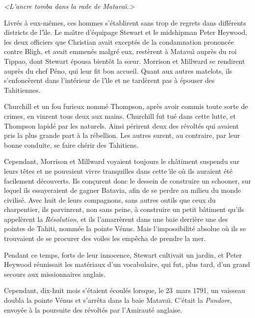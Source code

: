 \pageinsert
\vskip 15cm
\centerline{}
\smallskip
\centerline{\it <L'ancre tomba dans la rade de Matava\"\i.>}
\vfill
\endinsert

Livr\'es \`a eux-m\^emes, ces hommes s'\'etablirent
sans trop de regrets dans diff\'erents districts de
l'{\^\i}le. Le ma{\^\i}tre d'\'equipage Stewart et
le midshipman Peter Heywood, les deux officiers que
Christian avait except\'es de la condamnation
prononc\'ee contre Bligh, et avait emmen\'es
malgr\'e eux, rest\`erent \`a Matava{\"\i}
aupr\`es du roi Tippao, dont Stewart \'epousa
bient\^ot la s{\oe}ur. Morrison et Millward se rendirent
aupr\`es du chef P\'eno, qui leur fit bon accueil.
Quant aux autres matelots, ils s'enfonc\`erent dans
l'int\'erieur de l'{\^\i}le et ne tard\`erent
pas \`a \'epouser des Tahitiennes.

Churchill et un fou furieux nomm\'e Thompson, apr\`es
avoir commis toute sorte de crimes, en vinrent tous
deux aux mains. Churchill fut tu\'e dans cette lutte,
et Thompson lapid\'e par les naturels. Ainsi p\'erirent
deux des r\'evolt\'es qui avaient pris la plus grande
part \`a la r\'ebellion. Les autres surent, au contraire,
par leur bonne conduite, se faire ch\'erir des Tahitiens.

Cependant, Morrison et Millward voyaient toujours
le ch\^atiment suspendu sur leurs t\^etes et
ne pouvaient vivre tranquilles dans cette {\^\i}le
o\`u ils auraient \'et\'e facilement d\'ecouverts.
Ils con\c{c}urent donc le dessein de construire un schooner,
sur lequel ils essayeraient de gagner Batavia,
afin de se perdre au milieu du monde civilis\'e.
Avec huit de leurs compagnons, sans autres outils que ceux
du charpentier, ils parvinrent, non sans peine,
\`a construire un petit b\^atiment qu'ils
appel\`erent la {\sl R\'esolution},
et ils l'amarr\`erent dans une baie derri\`ere
une des pointes de Tahiti, nomm\'ee la pointe V\'enus.
Mais l'impossibilit\'e absolue o\`u ils se trouvaient
de se procurer des voiles les emp\^echa de prendre la mer.

Pendant ce temps, forts de leur innocence, Stewart
cultivait un jardin, et Peter Heywood r\'eunissait
les mat\'eriaux d'un vocabulaire, qui fut, plus tard,
d'un grand secours aux missionnaires anglais.

Cependant, dix-huit mois s'\'etaient \'ecoul\'es
lorsque, le 23~mars 1791, un vaisseau doubla la pointe
V\'enus et s'arr\^eta dans la baie Matava\"\i.
C'\'etait la {\sl Pandore}, envoy\'ee \`a la poursuite
des r\'evolt\'es par l'Amiraut\'e anglaise.

